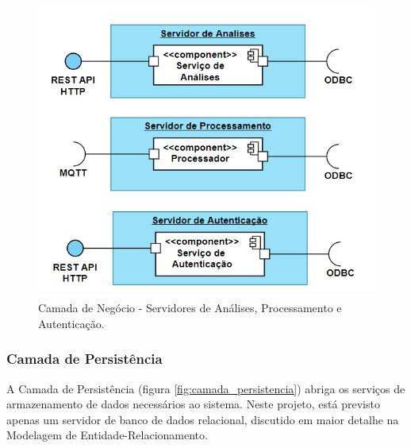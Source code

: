 \begin{figure}[h]
    \centering
    \includegraphics[scale=0.50]{figuras/projeto/software/camada_negocios.PNG}
    \caption{Camada de Negócio - Servidores de Análises, Processamento e Autenticação.}
    \label{fig:camada_negocios}
\end{figure}

\subsubsection{Camada de Persistência}

A Camada de Persistência (figura \ref{fig:camada_persistencia}) abriga os serviços de armazenamento de dados necessários ao sistema. Neste projeto, está previsto apenas um servidor de banco de dados relacional, discutido em maior detalhe na Modelagem de Entidade-Relacionamento.

